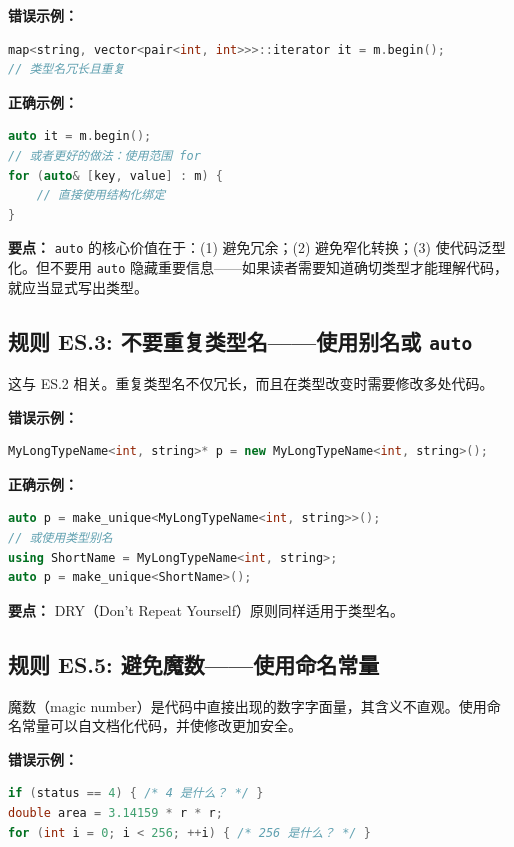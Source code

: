\textbf{错误示例：}

\begin{lstlisting}[language=C++]
map<string, vector<pair<int, int>>>::iterator it = m.begin();
// 类型名冗长且重复
\end{lstlisting}

\textbf{正确示例：}

\begin{lstlisting}[language=C++]
auto it = m.begin();
// 或者更好的做法：使用范围 for
for (auto& [key, value] : m) {
    // 直接使用结构化绑定
}
\end{lstlisting}

\textbf{要点：} \texttt{auto} 的核心价值在于：(1) 避免冗余；(2) 避免窄化转换；(3) 使代码泛型化。但不要用 \texttt{auto} 隐藏重要信息——如果读者需要知道确切类型才能理解代码，就应当显式写出类型。

\subsection*{\textbf{规则 ES.3:} 不要重复类型名——使用别名或 \texttt{auto}}

这与 ES.2 相关。重复类型名不仅冗长，而且在类型改变时需要修改多处代码。

\textbf{错误示例：}

\begin{lstlisting}[language=C++]
MyLongTypeName<int, string>* p = new MyLongTypeName<int, string>();
\end{lstlisting}

\textbf{正确示例：}

\begin{lstlisting}[language=C++]
auto p = make_unique<MyLongTypeName<int, string>>();
// 或使用类型别名
using ShortName = MyLongTypeName<int, string>;
auto p = make_unique<ShortName>();
\end{lstlisting}

\textbf{要点：} DRY（Don't Repeat Yourself）原则同样适用于类型名。

\subsection*{\textbf{规则 ES.5:} 避免魔数——使用命名常量}

魔数（magic number）是代码中直接出现的数字字面量，其含义不直观。使用命名常量可以自文档化代码，并使修改更加安全。

\textbf{错误示例：}

\begin{lstlisting}[language=C++]
if (status == 4) { /* 4 是什么？ */ }
double area = 3.14159 * r * r;
for (int i = 0; i < 256; ++i) { /* 256 是什么？ */ }
\end{lstlisting}


